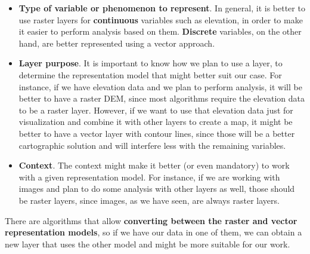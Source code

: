 \begin{itemize}
 \item \textbf{Type of variable or phenomenon to represent}. In general, it is better to use raster layers for \textbf{continuous} variables such as elevation, in order to make it easier to perform analysis based on them. \textbf{Discrete} variables, on the other hand, are better represented using a vector approach.
\item \textbf{Layer purpose}. It is important to know how we plan to use a layer, to determine the representation model that might better suit our case. For instance, if we have elevation data and we plan to perform analysis, it will be better to have a raster DEM, since most algorithms require the elevation data to be a raster layer. However, if we want to use that elevation data just for visualization and combine it with other layers to create a map, it might be better to have a vector layer with contour lines, since those will be a better cartographic solution and will interfere less with the remaining variables. 
\item \textbf{Context}. The context might make it better (or even mandatory) to work with a given representation model. For instance, if we are working with images and plan to do some analysis with other layers as well, those should be raster layers, since images, as we have seen, are always raster layers.
\end{itemize}

There are algorithms that allow \textbf{converting between the raster and vector representation models}, so if we have our data in one of them, we can obtain a new layer that uses the other model and might be more suitable for our work.

\pagestyle{empty}